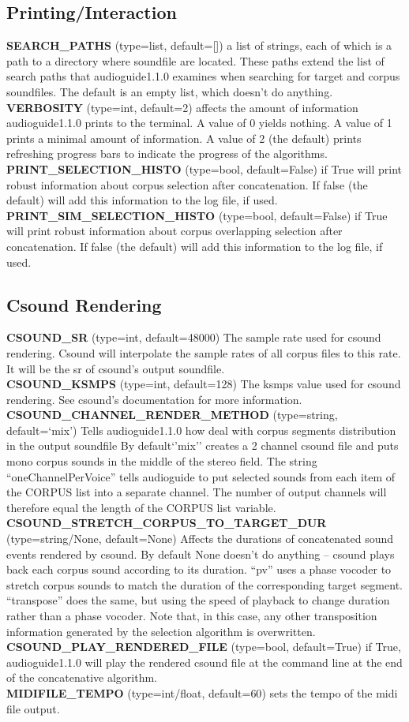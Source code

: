 \documentclass{article}
\newcommand{\optEntry}[4]{\textbf{#1} (type={\color{red}#2}, default={\color{ForestGreen}#3}) #4\hspace{0.5em}\\}
\newcommand{\ag}{audioguide1.1.0\xspace}
\begin{document}
\begin{spacing}{1.2}
\subsection{Printing/Interaction}
\optEntry{SEARCH\_PATHS}{list}{[]}{a list of strings, each of which is a path to a directory where soundfile are located.  These paths extend the list of search paths that \ag examines when searching for target and corpus soundfiles.  The default is an empty list, which doesn't do anything.}

\optEntry{VERBOSITY}{int}{2}{affects the amount of information \ag prints to the terminal.  A value of 0 yields nothing.  A value of 1 prints a minimal amount of information.  A value of 2 (the default) prints refreshing progress bars to indicate the progress of the algorithms.}

\optEntry{PRINT\_SELECTION\_HISTO}{bool}{False}{if True will print robust information about corpus selection after concatenation.  If false (the default) will add this information to the log file, if used.}

\optEntry{PRINT\_SIM\_SELECTION\_HISTO}{bool}{False}{if True will print robust information about corpus overlapping selection after concatenation.  If false (the default) will add this information to the log file, if used.}


\subsection{Csound Rendering}
\optEntry{CSOUND\_SR}{int}{48000}{The sample rate used for csound rendering.  Csound will interpolate the sample rates of all corpus files to this rate.  It will be the sr of csound's output soundfile.}

\optEntry{CSOUND\_KSMPS}{int}{128}{The ksmps value used for csound rendering.  See csound's documentation for more information.}

\optEntry{CSOUND\_CHANNEL\_RENDER\_METHOD}{string}{`mix'}{Tells \ag how deal with corpus segments distribution in the output soundfile  By default`'mix'' creates a 2 channel csound file and puts mono corpus sounds in the middle of the stereo field.  The string ``oneChannelPerVoice'' tells audioguide to put selected sounds from each item of the CORPUS list into a separate channel.  The number of output channels will therefore equal the length of the CORPUS list variable.}

\optEntry{CSOUND\_STRETCH\_CORPUS\_TO\_TARGET\_DUR}{string/None}{None}{Affects the durations of concatenated sound events rendered by csound.  By default None doesn't do anything -- csound plays back each corpus sound according to its duration.  ``pv'' uses a phase vocoder to stretch corpus sounds to match the duration of the corresponding target segment.  ``transpose'' does the same, but using the speed of playback to change duration rather than a phase vocoder.  Note that, in this case, any other transposition information generated by the selection algorithm is overwritten.}

\optEntry{CSOUND\_PLAY\_RENDERED\_FILE}{bool}{True}{if True, \ag will play the rendered csound file at the command line at the end of the concatenative algorithm.}

\optEntry{MIDIFILE\_TEMPO}{int/float}{60}{sets the tempo of the midi file output.}

\end{spacing}
\end{document}

